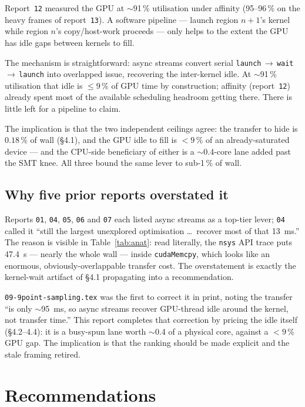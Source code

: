 \documentclass[
	english,
	letterpaper, oneside
]{article}
\begin{document}
Report~\texttt{12} measured the GPU at $\sim$91\,\% utilisation under affinity
(95--96\,\% on the heavy frames of report~\texttt{13}). A software pipeline ---
launch region $n{+}1$'s kernel while region $n$'s copy/host-work proceeds --- only
helps to the extent the GPU has idle gaps between kernels to fill.

The mechanism is straightforward: async streams convert serial
\texttt{launch}\,$\to$\,\texttt{wait}\,$\to$\,\texttt{launch} into overlapped
issue, recovering the inter-kernel idle. At $\sim$91\,\% utilisation that idle is
$\le 9\,\%$ of GPU time by construction; affinity (report~\texttt{12}) already
spent most of the available scheduling headroom getting there. There is little
left for a pipeline to claim.

The implication is that the two independent ceilings agree: the transfer to hide
is $0.18\,\%$ of wall (\S4.1), and the GPU idle to fill is $<9\,\%$ of an
already-saturated device --- and the CPU-side beneficiary of either is a
$\sim$0.4-core lane added past the SMT knee. All three bound the same lever to
sub-1\,\% of wall.

\subsection{Why five prior reports overstated it}

Reports \texttt{01}, \texttt{04}, \texttt{05}, \texttt{06} and \texttt{07} each
listed async streams as a top-tier lever; \texttt{04} called it ``still the
largest unexplored optimisation \dots\ recover most of that 13~ms.'' The reason
is visible in Table~\ref{tab:anat}: read literally, the \texttt{nsys} API trace
puts 47.4~s --- nearly the whole wall --- inside \texttt{cudaMemcpy}, which looks
like an enormous, obviously-overlappable transfer cost. The overstatement is
exactly the kernel-wait artifact of \S4.1 propagating into a recommendation.

\texttt{09-9point-sampling.tex} was the first to correct it in print, noting the
transfer ``is only $\sim$95~ms, so async streams recover GPU-thread idle
around the kernel, not transfer time.'' This report completes that correction by
pricing the idle itself (\S4.2--4.4): it is a busy-spun lane worth $\sim$0.4 of a
physical core, against a $<9\,\%$ GPU gap. The implication is that the ranking
should be made explicit and the stale framing retired.

\section{Recommendations}
\end{document}
